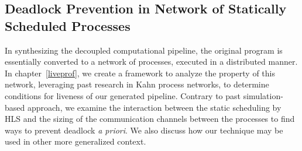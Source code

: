 \subsection{Deadlock Prevention in Network of Statically Scheduled Processes}
In synthesizing the decoupled computational pipeline, the original program
is essentially converted to a network of processes, executed in a distributed manner. In chapter~\ref{liveprof}, we create a framework to analyze the property of this network, leveraging past research in Kahn process networks, to determine conditions for liveness of our generated pipeline. 
Contrary to past simulation-based approach, we examine the interaction between the static scheduling by HLS and the sizing of the communication channels between the processes to find ways to prevent deadlock \textit{a priori}. We also
discuss how our technique may be used in other more generalized context.

